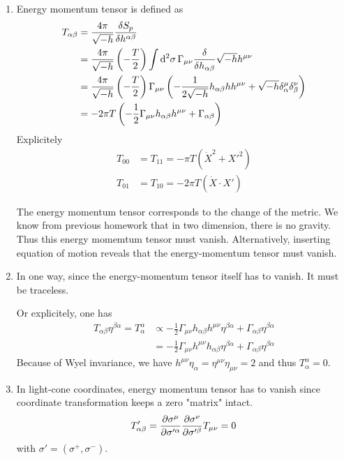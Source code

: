 \begin{enumerate}[label=(\alph*)]
	\item Energy momentum tensor is defined as 
		\begin{align}
			T_{\alpha\beta} &= \frac{4\pi}{\sqrt{-h}} \frac{\delta S_p}{\delta h^{\alpha\beta}} \notag \\
								 &= \frac{4\pi}{\sqrt{-h}} \left( - \frac{T}{2} \right) \int \dd[2]{\sigma} \Gamma_{\mu\nu} \frac{\delta}{\delta h_{\alpha\beta}} \sqrt{-h} h^{\mu\nu} \notag \\
								 &= \frac{4\pi}{\sqrt{-h}} \left( - \frac{T}{2} \right) \Gamma_{\mu\nu} \left( - \frac{1}{2\sqrt{-h}} h_{\alpha\beta} h  h^{\mu\nu}     + \sqrt{-h} \delta^\mu_\alpha \delta^\nu_\beta \right) \notag \\
								 &= - 2 \pi T \left( - \frac{1}{2} \Gamma_{\mu\nu} h_{\alpha\beta} h^{\mu\nu} + \Gamma_{\alpha\beta} \right) 
		\end{align}
		Explicitely
		\begin{align*}
			T_{00} &= T_{11} = - \pi T (\dot{X}^2 + X'^2)\\
			T_{01} &= T_{10} = -2\pi T (\dot{X} \cdot X')
		\end{align*}

		The energy momentum tensor corresponds to the change of the metric. We know from previous homework that in two dimension, there is no gravity. Thus this energy momemtum tensor must vanish. Alternatively, inserting equation of motion reveals that the energy-momentum tensor must vanish.


	\item In one way, since the energy-momentum tensor itself has to vanish. It must be traceless.
		
		Or explicitely, one has 
		\begin{align*}
			T_{\alpha\beta} \eta^{\beta \alpha} = T^{\alpha}_{\alpha} &\propto - \frac{1}{2} \Gamma_{\mu\nu} h_{\alpha\beta} h^{\mu\nu} \eta^{\beta\alpha}  + \Gamma_{\alpha\beta} \eta^{\beta\alpha} \\
																						 &= - \frac{1}{2} \Gamma_{\mu\nu} h^{\mu\nu} h_{\alpha\beta} \eta^{\beta\alpha} + \Gamma_{\alpha\beta} \eta^{\beta\alpha}
		\end{align*}
		Because of Wyel invariance, we have $h^{\mu\nu} \eta_{\alpha} = \eta^{\mu\nu} \eta_{\mu\nu} = 2$ and thus $T_\alpha^{\alpha} = 0$.

	\item In light-cone coordinates, energy momentum tensor has to vanish since coordinate transformation keeps a zero "matrix" intact.
		\begin{equation}
			T'_{\alpha \beta} = \pdv{\sigma^\mu}{\sigma'^\alpha} \pdv{\sigma^\nu}{\sigma'^\beta} T_{\mu\nu} = 0
		\end{equation}
		with $\sigma'=(\sigma^+, \sigma^-)$.


\end{enumerate}
